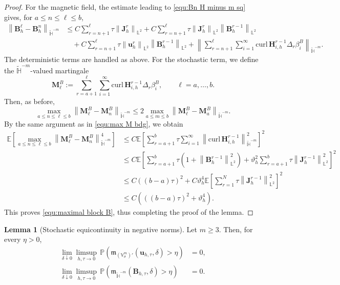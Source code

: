 \documentclass[11pt, reqno]{amsart}
\theoremstyle{definition}
\newtheorem{lemma}[theorem]{Lemma}
\numberwithin{equation}{section}
\newcommand{\curl}{\mathrm{curl}\,}
\newcommand{\bff}{\boldsymbol}
\newcommand{\bb}{\mathbb}
\newcommand{\norm}[2]{\left\|{#1}\right\|_{#2}}
\begin{document}
\begin{proof}
	For the magnetic field, the estimate leading to \eqref{equ:Bn H minus m sq}
	gives, for $a\le n\le \ell\le b$,
	\begin{align*}
		\norm{\bff B_h^\ell-\bff B_h^n}{\widetilde{\bb H}^{-m}}
		&\le
		C\sum_{r=n+1}^{\ell}\tau\norm{\bff J_h^r}{\bb L^2}
		+
		C\sum_{r=n+1}^{\ell}\tau
		\norm{\bff J_h^r}{\bb L^2}
		\norm{\bff B_h^{r-1}}{\bb L^2}
		\\
		&\quad
		+
		C\sum_{r=n+1}^{\ell}\tau
		\norm{\bff u_h^r}{\bb L^2}
		\norm{\bff B_h^{r-1}}{\bb L^2}
		+
		\norm{
			\sum_{r=n+1}^{\ell}\sum_{i=1}^{\infty}
			\curl\bff H_{i,h}^{r-1}\Delta_r\beta_i^B
		}{\widetilde{\bb H}^{-m}}.
	\end{align*}
	The deterministic terms are handled as above. 
	For the stochastic term, we define the \(\widetilde{\bb H}^{-m}\)-valued martingale
	\[
	\bff M_\ell^B
	:=
	\sum_{r=a+1}^{\ell}\sum_{i=1}^{\infty}
	\curl\bff H_{i,h}^{r-1}\Delta_r\beta_i^B,
	\qquad \ell=a,\ldots,b.
	\]
	Then, as before,
	\[
	\max_{a\le n\le \ell\le b}
	\norm{\bff M_\ell^B-\bff M_n^B}{\widetilde{\bb H}^{-m}}
	\le
	2\max_{a\le m\le b}
	\norm{\bff M_\ell^B-\bff M_a^B}{\widetilde{\bb H}^{-m}}.
	\]
	By the same argument as in \eqref{equ:max M bdg}, we obtain
	\begin{align*}
		\bb E
		\left[
		\max_{a\le n\le \ell\le b}
		\norm{\bff M_\ell^B-\bff M_n^B}{\widetilde{\bb H}^{-m}}^{4}
		\right]
		&\le
		C
		\bb E
		\left[
		\sum_{r=a+1}^{b}\tau
		\sum_{i=1}^{\infty}
		\norm{\curl\bff H_{i,h}^{r-1}}{\widetilde{\bb H}^{-m}}^{2}
		\right]^2
		\\
		&\le
		C
		\bb E
		\left[
		\sum_{r=a+1}^{b}\tau
		\left(
		1+\norm{\bff B_h^{r-1}}{\bb L^2}^2
		\right)
		+
		\vartheta_h^2
		\sum_{r=a+1}^{b}\tau
		\norm{\bff J_h^{r-1}}{\bb L^2}^2
		\right]^2
		\\
		&\le
		C((b-a)\tau)^2
		+
		C \vartheta_h^4
		\bb E
		\left[
		\sum_{r=1}^{N}\tau
		\norm{\bff J_h^{r-1}}{\bb L^2}^2
		\right]^2
		\\
		&\le
		C\left(((b-a)\tau)^2+ \vartheta_h^4\right).
	\end{align*}
	This proves \eqref{equ:maximal block B}, thus completing the proof of the lemma.
\end{proof}


\begin{lemma}[Stochastic equicontinuity in negative norms]
	\label{lem:stochastic equicontinuity negative}
	Let \(m\ge3\). Then, for every \(\eta>0\),
	\begin{align}
		\label{equ:stoch equicont u negative}
		\lim_{\delta\downarrow0}
		\limsup_{h,\tau\to0}\,
		\bb P\left(
		\mathfrak m_{(\bb V^m_\sigma)'}
		(\bff u_{h,\tau},\delta)>\eta
		\right)
		&=0,
		\\
		\label{equ:stoch equicont B negative}
		\lim_{\delta\downarrow0}
		\limsup_{h,\tau\to0}\,
		\bb P\left(
		\mathfrak m_{\widetilde{\bb H}^{-m}}
		(\bff B_{h,\tau},\delta)>\eta
		\right)
		&=0.
	\end{align}
\end{lemma}
\end{document}

